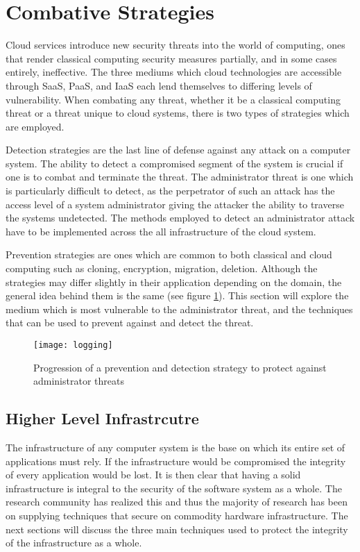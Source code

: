 \section{Combative Strategies}
\label{overview}

Cloud services introduce new security threats into the world of computing, ones that render classical computing security measures partially, and in some cases entirely, ineffective. The three mediums which cloud technologies are accessible through SaaS, PaaS, and IaaS each lend themselves to differing levels of vulnerability.\cite{theoharidou}\cite{subashini} When combating any threat, whether it be a classical computing threat or a threat unique to cloud systems, there is two types of strategies which are employed.

Detection strategies are the last line of defense against any attack on a computer system. The ability to detect a compromised segment of the system is crucial if one is to combat and terminate the threat. The administrator threat is one which is particularly difficult to detect, as the perpetrator of such an attack has the access level of a system administrator giving the attacker the ability to traverse the systems undetected. The methods employed to detect an administrator attack have to be implemented across the all infrastructure of the cloud system.\cite{dawoud}

Prevention strategies are ones which are common to both classical and cloud computing such as cloning, encryption, migration, deletion. Although the strategies may differ slightly in their application depending on the domain, the general idea behind them is the same (see figure \ref{prevention_detection_image}).
This section will explore the medium which is most vulnerable to the administrator threat, and the techniques that can be used to prevent against and detect the threat.

\begin{figure}
  \centering
    \texttt{[image: logging]}
  \caption{Progression of a prevention and detection strategy to protect against administrator threats}
  \label{prevention_detection_image}
\end{figure}

\subsection{Higher Level Infrastrcutre}
\label{hlInfrastructure}

The infrastructure of any computer system is the base on which its entire set of applications must rely. If the infrastructure would be compromised the integrity of every application would be lost. \cite{dawoud} It is then clear that having a solid infrastructure is integral to the security of the software system as a whole. The research community has realized this and thus the majority of research has been on supplying techniques that secure on commodity hardware infrastructure. The next sections will discuss the three main techniques used to protect the integrity of the infrastructure as a whole.

